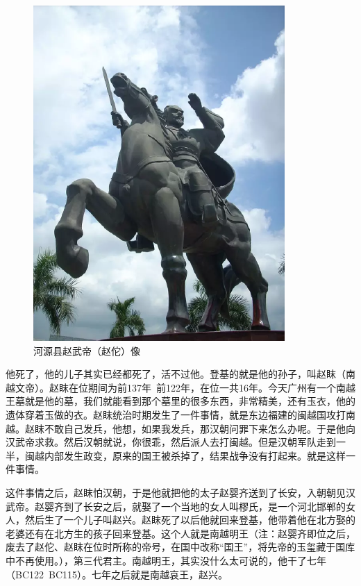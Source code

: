 \begin{figure}
	\centering
	\includegraphics[width=\textwidth]{images/image-9}
	\caption{河源县赵武帝（赵佗）像}
\end{figure}

他死了，他的儿子其实已经都死了，活不过他。登基的就是他的孙子，叫赵眜（南越文帝）。赵眜在位期间为前137年~前122年，在位一共16年。今天广州有一个南越王墓就是他的墓，我们就能看到那个墓里的很多东西，非常精美，还有玉衣，他的遗体穿着玉做的衣。赵眜统治时期发生了一件事情，就是东边福建的闽越国攻打南越。赵眜不敢自己发兵，他想，如果我发兵，那汉朝问罪下来怎么办呢。于是他向汉武帝求救。然后汉朝就说，你很乖，然后派人去打闽越。但是汉朝军队走到一半，闽越内部发生政变，原来的国王被杀掉了，结果战争没有打起来。就是这样一件事情。

这件事情之后，赵眜怕汉朝，于是他就把他的太子赵婴齐送到了长安，入朝朝见汉武帝。赵婴齐到了长安之后，就娶了一个当地的女人叫樛氏，是一个河北邯郸的女人，然后生了一个儿子叫赵兴。赵眜死了以后他就回来登基，他带着他在北方娶的老婆还有在北方生的孩子回来登基。这个人就是南越明王（注：赵婴齐即位之后，废去了赵佗、赵眜在位时所称的帝号，在国中改称“国王”，将先帝的玉玺藏于国库中不再使用。），第三代君主。南越明王，其实没什么太可说的，他干了七年（BC122~BC115）。七年之后就是南越哀王，赵兴。

